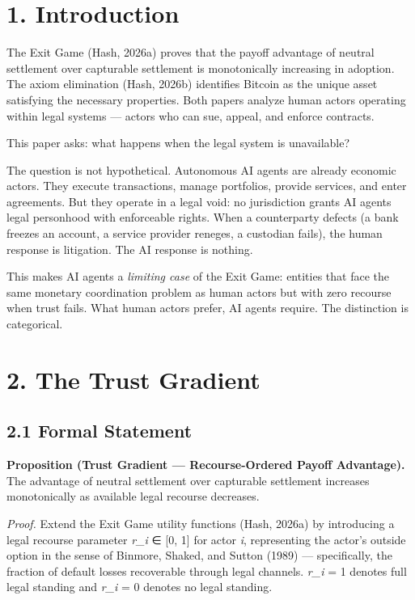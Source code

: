 \documentclass[12pt]{article}
\theoremstyle{definition}
\theoremstyle{remark}
\begin{document}
\section{1. Introduction}\label{introduction}

The Exit Game (Hash, 2026a) proves that the payoff advantage of neutral
settlement over capturable settlement is monotonically increasing in
adoption. The axiom elimination (Hash, 2026b) identifies Bitcoin as the
unique asset satisfying the necessary properties. Both papers analyze
human actors operating within legal systems --- actors who can sue,
appeal, and enforce contracts.

This paper asks: what happens when the legal system is unavailable?

The question is not hypothetical. Autonomous AI agents are already
economic actors. They execute transactions, manage portfolios, provide
services, and enter agreements. But they operate in a legal void: no
jurisdiction grants AI agents legal personhood with enforceable rights.
When a counterparty defects (a bank freezes an account, a service
provider reneges, a custodian fails), the human response is litigation.
The AI response is nothing.

This makes AI agents a \emph{limiting case} of the Exit Game: entities
that face the same monetary coordination problem as human actors but
with zero recourse when trust fails. What human actors prefer, AI agents
require. The distinction is categorical.


\section{2. The Trust Gradient}\label{the-trust-gradient}

\subsection{2.1 Formal Statement}\label{formal-statement}

\textbf{Proposition (Trust Gradient --- Recourse-Ordered Payoff
Advantage).} The advantage of neutral settlement over capturable
settlement increases monotonically as available legal recourse
decreases.

\emph{Proof.} Extend the Exit Game utility functions (Hash, 2026a) by
introducing a legal recourse parameter \emph{r\_i} ∈ {[}0, 1{]} for
actor \emph{i}, representing the actor's outside option in the sense of
Binmore, Shaked, and Sutton (1989) --- specifically, the fraction of
default losses recoverable through legal channels. \emph{r\_i} = 1
denotes full legal standing and \emph{r\_i} = 0 denotes no legal
standing.
\end{document}
